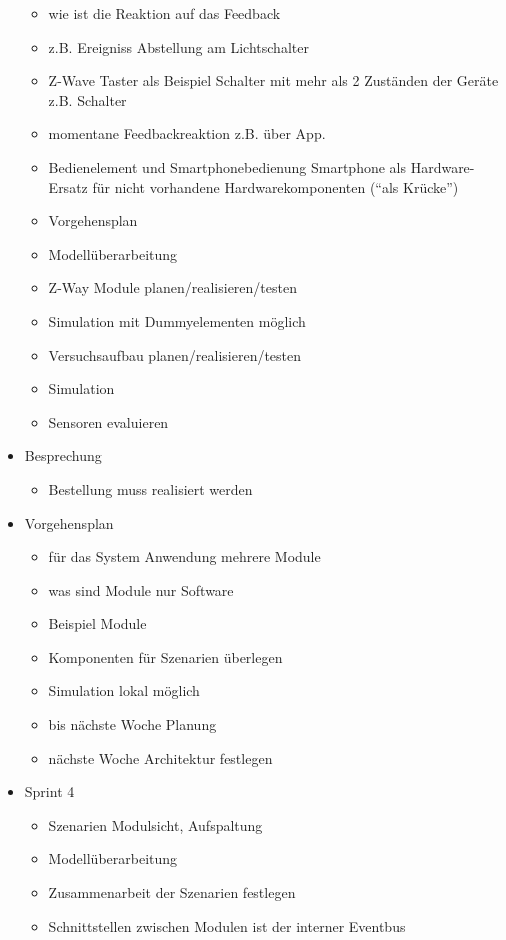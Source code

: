 \begin{itemize}
\begin{itemize}
		\item wie ist die Reaktion auf das Feedback
		\item z.B. Ereigniss Abstellung am Lichtschalter
		\item Z-Wave Taster als Beispiel Schalter mit mehr als 2 Zuständen der Geräte z.B. Schalter
		\item momentane Feedbackreaktion z.B. über App.
		\item Bedienelement und Smartphonebedienung \textrightarrow{ }Smartphone als Hardware-Ersatz für nicht vorhandene Hardwarekomponenten ("`als Krücke"')
		\item Vorgehensplan
		\item Modellüberarbeitung
		\item Z-Way Module planen/realisieren/testen
		\item Simulation mit Dummyelementen möglich
		\item Versuchsaufbau planen/realisieren/testen
		\item Simulation
		\item Sensoren evaluieren
	\end{itemize}
	\item Besprechung
	\begin{itemize}
		\item Bestellung muss realisiert werden
	\end{itemize}
	\item Vorgehensplan
	\begin{itemize}
		\item für das System Anwendung mehrere Module
		\item was sind Module \textrightarrow nur Software
		\item Beispiel Module
		\item Komponenten für Szenarien überlegen
		\item Simulation lokal möglich
		\item bis nächste Woche Planung
		\item nächste Woche Architektur festlegen
	\end{itemize}
	\item Sprint 4
	\begin{itemize}
		\item Szenarien Modulsicht, Aufspaltung
		\item Modellüberarbeitung
		\item Zusammenarbeit der Szenarien festlegen
		\item Schnittstellen zwischen Modulen ist der interner Eventbus

\end{itemize}
\end{itemize}
